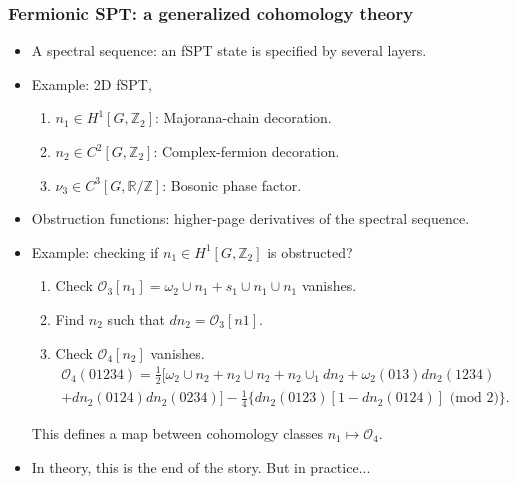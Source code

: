 \documentclass[xcolor=table, aspectratio=169]{beamer}
\newcommand{\uone}{\mathbb R/\mathbb Z}
\begin{document}
\begin{frame}
	\frametitle{Fermionic SPT: a generalized cohomology theory}
	\begin{itemize}
		\item A spectral sequence: an fSPT state is specified by several layers.
		\item Example: 2D fSPT,
		\begin{enumerate}
			\item $n_1\in H^1[G, \mathbb Z_2]$: Majorana-chain decoration.
			\item $n_2\in C^2[G, \mathbb Z_2]$: Complex-fermion decoration.
			\item $\nu_3\in C^3[G, \uone]$: Bosonic phase factor.
		\end{enumerate}
		\item Obstruction functions: higher-page derivatives of the spectral sequence.
		\item Example: checking if $n_1\in H^1[G, \mathbb Z_2]$ is obstructed?
		\begin{enumerate}
			\item Check $\mathcal O_3[n_1] = \omega_2\cup n_1 + s_1\cup n_1\cup n_1$ vanishes.
			\item Find $n_2$ such that $dn_2 = \mathcal O_3[n1]$.
			\item Check $\mathcal O_4[n_2]$ vanishes.
			\begin{align*}\mathcal O_4(01234) = \frac12\big[\omega_2\cup n_2 + n_2\cup n_2 + n_2 \cup_1 dn_2 + \omega_2(013)dn_2(1234)\\ + dn_2(0124)dn_2(0234)\big]
			-\frac14\big\{dn_2(0123)[1-dn_2(0124)]\text{ (mod 2)}\big\}.
		\end{align*}
		\end{enumerate}
		This defines a map between cohomology classes
		$n_1\mapsto \mathcal O_4$.
		\item In theory, this is the end of the story. But in practice...
	\end{itemize}
\end{frame}
\end{document}
